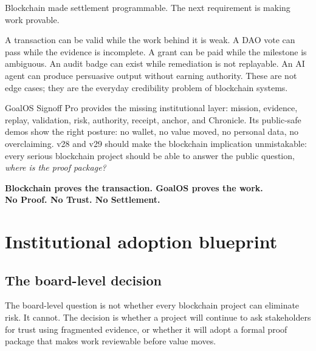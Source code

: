 Blockchain made settlement programmable. The next requirement is making work provable.

A transaction can be valid while the work behind it is weak. A DAO vote can pass while the evidence is incomplete. A grant can be paid while the milestone is ambiguous. An audit badge can exist while remediation is not replayable. An AI agent can produce persuasive output without earning authority. These are not edge cases; they are the everyday credibility problem of blockchain systems.

GoalOS Signoff Pro provides the missing institutional layer: mission, evidence, replay, validation, risk, authority, receipt, anchor, and Chronicle. Its public-safe demos show the right posture: no wallet, no value moved, no personal data, no overclaiming. v28 and v29 should make the blockchain implication unmistakable: every serious blockchain project should be able to answer the public question, \emph{where is the proof package?}

\begin{standardbox}
\begin{center}
{\Large\bfseries Blockchain proves the transaction. GoalOS proves the work.}\\[4pt]
{\Large\bfseries No Proof. No Trust. No Settlement.}
\end{center}
\end{standardbox}

\newpage
\appendix


\section{Institutional adoption blueprint}

\subsection{The board-level decision}

The board-level question is not whether every blockchain project can eliminate risk. It cannot. The decision is whether a project will continue to ask stakeholders for trust using fragmented evidence, or whether it will adopt a formal proof package that makes work reviewable before value moves.

